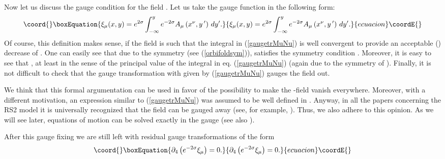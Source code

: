 \documentclass[a4paper,12pt]{article}
\begin{document}
Now let us discuss the  gauge condition for the field \coordHE{}.
Let us take the gauge function \coordHE{} in the following form:
\begin{equation}\coord{}\boxEquation{\label{gaugetrMuNu}
\xi_{\mu}(x,y)=e^{2\sigma}\int_{-\infty}^{y}e^{-2\sigma}
A_{\mu}\left(x^{\nu},y\,'\right)\,dy'.
}{\xi_{\mu}(x,y)=e^{2\sigma}\int_{-\infty}^{y}e^{-2\sigma}
A_{\mu}\left(x^{\nu},y\,'\right)\,dy'.
}{ecuacion}\coordE{}\end{equation}
Of course, this  definition makes sense, if the field \coordHE{} is such
that the integral in (\ref{gaugetrMuNu}) is well convergent to provide  an
acceptable (\coordHE{}) decrease of \myHighlight{$\xi_{\mu}$}\coordHE{}. One can easily see
that due to the symmetry \coordHE{} (see
(\ref{orbifoldsym})), \coordHE{} satisfies the symmetry condition
\coordHE{}. Moreover, it is easy to see that
\coordHE{}, at least in the sense of the
principal value of the integral in eq. (\ref{gaugetrMuNu}) (again due to
the symmetry of \coordHE{}). Finally, it is not difficult
to check that the gauge transformation with \myHighlight{$\xi_{\mu}$}\coordHE{} given by
(\ref{gaugetrMuNu}) gauges the field \coordHE{} out.

We think that this formal argumentation can be used in favor of the
possibility to make the \coordHE{}-field vanish  everywhere. Moreover, with
a different motivation, an expression similar to  (\ref{gaugetrMuNu}) was
assumed to be well defined in \cite{AIMVV}. Anyway, in all the papers
concerning the RS2 model it is universally recognized that the field
\coordHE{} can be gauged away (see, for example, \cite{Kakushadze}). Thus,
we also adhere to this opinion. As we will see later, equations of motion
can be solved exactly in the gauge \coordHE{} (see also
\cite{Kakushadze}).

After this gauge fixing we are still left with residual gauge
transformations of the form
\begin{equation}\coord{}\boxEquation{\label{remgaugetr}
\partial_{4}\left(e^{-2\sigma}\xi_{\mu}\right)=0.
}{\partial_{4}\left(e^{-2\sigma}\xi_{\mu}\right)=0.
}{ecuacion}\coordE{}\end{equation}
\end{document}
